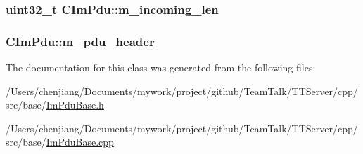 \subsubsection[{m\+\_\+incoming\+\_\+len}]{\setlength{\rightskip}{0pt plus 5cm}uint32\+\_\+t C\+Im\+Pdu\+::m\+\_\+incoming\+\_\+len\hspace{0.3cm}{\ttfamily [protected]}}\label{class_c_im_pdu_a0937ed4177688a4606e0264fc14588d1}
\hypertarget{class_c_im_pdu_a56174680efa94043e03097d14a58faaa}{}
\subsubsection[{m\+\_\+pdu\+\_\+header}]{ C\+Im\+Pdu\+::m\+\_\+pdu\+\_\+header\hspace{0.3cm}{\ttfamily [protected]}}\label{class_c_im_pdu_a56174680efa94043e03097d14a58faaa}


The documentation for this class was generated from the following files\+:\begin{DoxyCompactItemize}
\item 
/\+Users/chenjiang/\+Documents/mywork/project/github/\+Team\+Talk/\+T\+T\+Server/cpp/src/base/\hyperlink{_im_pdu_base_8h}{Im\+Pdu\+Base.\+h}\item 
/\+Users/chenjiang/\+Documents/mywork/project/github/\+Team\+Talk/\+T\+T\+Server/cpp/src/base/\hyperlink{_im_pdu_base_8cpp}{Im\+Pdu\+Base.\+cpp}\end{DoxyCompactItemize}
